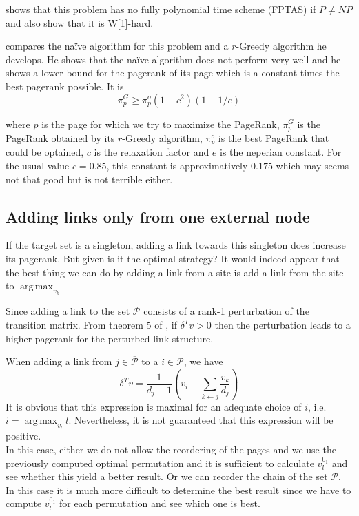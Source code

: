 \documentclass{article}
\DeclareMathOperator*{\argmax}{arg\,max}
\newcommand{\1}{\mathbf{1}}
\theoremstyle{definition}
\begin{document}
\cite{olsen2010maximizing} shows that this problem has no fully polynomial time scheme (FPTAS) if \(P \neq NP\) and also show that it is W[1]-hard.

\cite{olsen2010constant} compares the naïve algorithm for this problem and a \(r\)-Greedy algorithm he develops.
He shows that the naïve algorithm does not perform very well and he shows a lower bound for the pagerank of its page which is a constant times the best pagerank possible. It is
\[ \pi_p^G \geq \pi_p^o(1 - c^2)(1 - 1/e) \]

where $p$ is the page for which we try to maximize the PageRank,
$\pi_p^G$ is the PageRank obtained by its $r$-Greedy algorithm, $\pi_p^o$ is the best PageRank that could be optained, $c$ is the relaxation factor and $e$ is the neperian constant.
For the usual value $c = 0.85$, this constant is approximatively $0.175$ which may seems not that good but is not terrible either.

\subsection{Adding links only from one external node}
If the target set is a singleton, adding a link towards this singleton does increase its pagerank. But given is it the optimal strategy? It would indeed appear that the best thing we can do by adding a link from a site is add a link from the site to $\argmax_{v_k}$

Since adding a link to the set $\mathcal{P}$ consists of a rank-1 perturbation of the transition matrix. From theorem 5 of \cite{de2008maximizing}, if $\delta^Tv>0$ then the perturbation leads to a higher pagerank for the perturbed link structure.

When adding a link from $j \in \overline{\mathcal{P}}$ to a $i \in \mathcal{P}$, we have
$$ \delta^Tv = \frac{1}{d_{j}+1}\left(v_i-\sum_{k\leftarrow j}\frac{v_k}{d_j}\right)$$
It is obvious that this expression is maximal for an adequate choice of $i$, i.e. $i = \argmax_{v_l} l$. Nevertheless, it is not guaranteed that this expression will be positive.\\
In this case, either we do not allow the reordering of the pages and we use the previously computed optimal permutation and it is sufficient to calculate $v^{0_1}_{l}$ and see whether this yield a better result. Or we can reorder the chain of the set $\mathcal{P}$. In this case it is much more difficult to determine the best result since we have to compute $v^{0_1}_{l}$ for each permutation and see which one is best.
\end{document}
